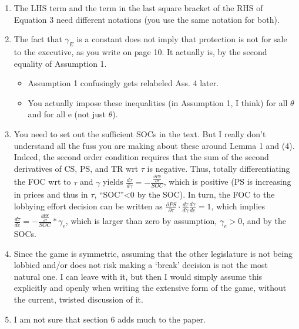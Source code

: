\documentclass[12pt]{article}
\begin{document}
\begin{enumerate}
	\item The LHS term and the term in the last square bracket of the RHS of Equation 3 need different notations (you use the same notation for both).
	\item The fact that $\gamma_E$ is a constant does not imply that protection is not for sale to the executive, as you write on page 10. It actually is, by the second equality of Assumption 1.
		\begin{itemize}
			\item Assumption 1 confusingly gets relabeled Ass. 4 later.
			\item You actually impose these inequalities (in Assumption 1, I think) for all $\theta$ and for all e (not just $\theta$).
		\end{itemize}
	\item You need to set out the sufficient SOCs in the text. But I really don’t understand all the fuss you are making about these around Lemma 1 and (4). Indeed, the second order condition requires that the sum of the second derivatives of CS, PS, and TR wrt $\tau$ is negative. Thus, totally differentiating the FOC wrt to $\tau$ and $\gamma$ yields $\frac{d\tau}{d\gamma} = - \frac{\frac{\partial PS}{\partial\tau}}{SOC}$, which is positive (PS is increasing in prices and thus in $\tau$, “SOC”<0 by the SOC). In turn, the FOC to the lobbying effort decision can be written as $\frac{\partial PS}{\partial\tau} \cdot \frac{d\tau}{d\gamma} \frac{ d\gamma}{de} = 1$, which implies $\frac{d\tau}{d e} = - \frac{\frac{\partial PS}{ \partial\tau}}{ SOC} * \gamma_e$, which is larger than zero by assumption, $\gamma_e>0$, and by the SOCs.
	\addtocounter{enumi}{1}
	\item Since the game is symmetric, assuming that the other legislature is not being lobbied and/or does not risk making a ‘break’ decision is not the most natural one. I can leave with it, but then I would simply assume this explicitly and openly when writing the extensive form of the game, without the current, twisted discussion of it.
	\item I am not sure that section 6 adds much to the paper.
\end{enumerate}
\end{document}
